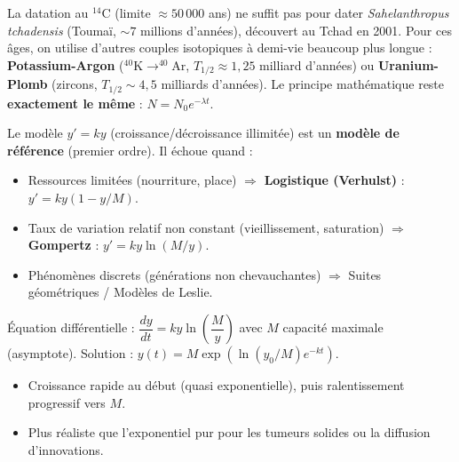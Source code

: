 \documentclass[11pt]{article}
\begin{document}
\begin{savaistu}
La datation au $^{14}\text{C}$ (limite $\approx 50\,000$ ans) ne suffit pas pour dater \emph{Sahelanthropus tchadensis} (Toumaï, $\sim 7$ millions d'années), découvert au Tchad en 2001. Pour ces âges, on utilise d'autres couples isotopiques à demi-vie beaucoup plus longue : \textbf{Potassium-Argon} ($^{40}\text{K} \to ^{40}\text{Ar}$, $T_{1/2} \approx 1,25$ milliard d'années) ou \textbf{Uranium-Plomb} (zircons, $T_{1/2} \sim 4,5$ milliards d'années). Le principe mathématique reste \textbf{exactement le même} : $N = N_0 e^{-\lambda t}$.
\end{savaistu}

\begin{aretenir}
Le modèle $y' = ky$ (croissance/décroissance illimitée) est un \textbf{modèle de référence} (premier ordre). Il échoue quand :
\begin{itemize}
    \item Ressources limitées (nourriture, place) $\Rightarrow$ \textbf{Logistique (Verhulst)} : $y' = ky(1 - y/M)$.
    \item Taux de variation relatif non constant (vieillissement, saturation) $\Rightarrow$ \textbf{Gompertz} : $y' = ky \ln(M/y)$.
    \item Phénomènes discrets (générations non chevauchantes) $\Rightarrow$ Suites géométriques / Modèles de Leslie.
\end{itemize}
\end{aretenir}

\begin{propriete}
Équation différentielle : $\dfrac{dy}{dt} = k y \ln\left(\dfrac{M}{y}\right)$ avec $M$ capacité maximale (asymptote).
Solution : $y(t) = M \exp\left( \ln(y_0/M) e^{-kt} \right)$.
\begin{itemize}
    \item Croissance rapide au début (quasi exponentielle), puis ralentissement progressif vers $M$.
    \item Plus réaliste que l'exponentiel pur pour les tumeurs solides ou la diffusion d'innovations.
\end{itemize}
\end{propriete}
\end{document}
